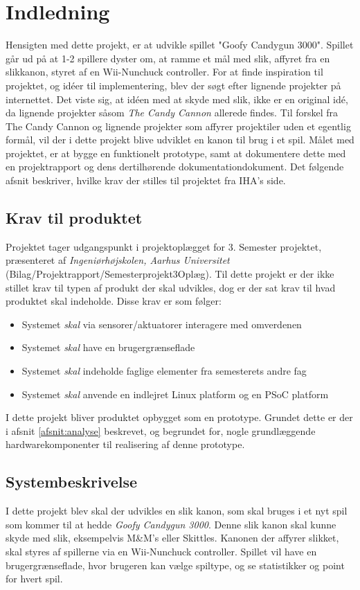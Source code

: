 \chapter{Indledning}
Hensigten med dette projekt, er at udvikle spillet "Goofy Candygun 3000". Spillet går ud på at 1-2 spillere dyster om, at ramme et mål med slik, affyret fra en slikkanon, styret af en Wii-Nunchuck controller. For at finde inspiration til projektet, og idéer til implementering, blev der søgt efter lignende projekter på internettet. Det viste sig, at idéen med at skyde med slik, ikke er en original idé, da lignende projekter såsom \textit{The Candy Cannon} \cite{CandyCannon} allerede findes. Til forskel fra The Candy Cannon og lignende projekter som affyrer projektiler uden et egentlig formål, vil der i dette projekt blive udviklet en kanon til brug i et spil. 
Målet med projektet, er at bygge en funktionelt prototype, samt at dokumentere dette med en projektrapport og dens dertilhørende dokumentationdokument. 
Det følgende afsnit beskriver, hvilke krav der stilles til projektet fra IHA's side.

\section{Krav til produktet}
Projektet tager udgangspunkt i projektoplægget for 3. Semester projektet, præsenteret af \textit{Ingeniørhøjskolen, Aarhus Universitet} (Bilag/Projektrapport/Semesterprojekt3Oplæg). Til dette projekt er der ikke stillet krav til typen af produkt der skal udvikles, dog er der sat krav til hvad produktet skal indeholde. Disse krav er som følger:

\begin{itemize}
	\item{Systemet \textit{skal} via sensorer/aktuatorer interagere med omverdenen}
	\item{Systemet \textit{skal} have en brugergrænseflade}
	\item{Systemet \textit{skal} indeholde faglige elementer fra semesterets andre fag}
	\item{Systemet \textit{skal} anvende en indlejret Linux platform og en PSoC platform}
\end{itemize}

\noindent I dette projekt bliver produktet opbygget som en prototype. Grundet dette er der i afsnit \ref{afsnit:analyse} beskrevet, og begrundet for, nogle grundlæggende hardwarekomponenter til realisering af denne prototype.


\section{Systembeskrivelse}
\label{afsnit:systembeskrivelse}
I dette projekt blev skal der udvikles en slik kanon, som skal bruges i et nyt spil som kommer til at hedde \textit{Goofy Candygun 3000}. Denne slik kanon skal kunne skyde med slik, eksempelvis M\&M’s eller Skittles. Kanonen der affyrer slikket, skal styres af spillerne via en Wii-Nunchuck controller. Spillet vil have en brugergrænseflade, hvor brugeren kan vælge spiltype, og se statistikker og point for hvert spil. \newline

